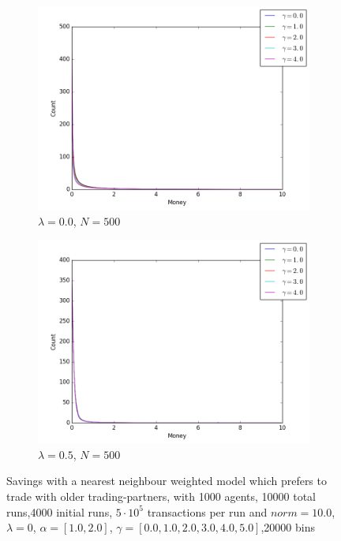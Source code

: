 \documentclass[a4paper,11pt]{article}
\begin{document}
{\begin{figure}[H]
	\centering
	\begin{subfigure}[t]{0.45\textwidth}
		\includegraphics[scale=0.4]{historic_lambda=0_0_alpha=1}
		\caption{$\lambda = 0.0$, $N=500$}
		\label{fig:historic_lambda=0_0_alpha=1}
	\end{subfigure}
	\begin{subfigure}[t]{0.45\textwidth}
		\includegraphics[scale=0.4]{historic_lambda=0_0_alpha=2}
		\caption{$\lambda = 0.5$, $N=500$}
		\label{fig:historic_lambda=0_0_alpha=2}
	\end{subfigure}
	\caption{Savings with a nearest neighbour weighted model which prefers to trade with older trading-partners, with 1000 agents, 10000 total runs,4000 initial runs,  $5\cdot 10^{5}$ transactions per run and  $norm=10.0$,$\lambda=0$, $\alpha=[1.0,2.0]$, $\gamma=[0.0,1.0,2.0,3.0,4.0,5.0]$,20000 bins}
	\label{fig:history_lambda=0_0}
\end{figure}


}
\end{document}
